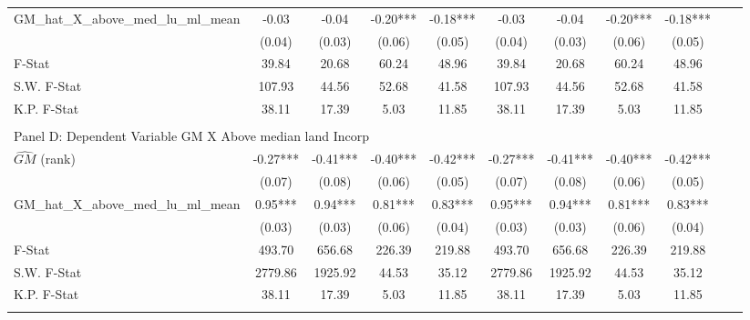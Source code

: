 \begin{table}[htbp]
\begin{threeparttable}
\begin{tabular}{l*{10}{c}}
\addlinespace
GM\_hat\_X\_above\_med\_lu\_ml\_mean&      -0.03   &      -0.04   &      -0.20***&      -0.18***&      -0.03   &      -0.04   &      -0.20***&      -0.18***\\
                &     (0.04)   &     (0.03)   &     (0.06)   &     (0.05)   &     (0.04)   &     (0.03)   &     (0.06)   &     (0.05)   \\
\midrule
F-Stat          &      39.84   &      20.68   &      60.24   &      48.96   &      39.84   &      20.68   &      60.24   &      48.96   \\
S.W. F-Stat     &     107.93   &      44.56   &      52.68   &      41.58   &     107.93   &      44.56   &      52.68   &      41.58   \\
K.P. F-Stat     &      38.11   &      17.39   &       5.03   &      11.85   &      38.11   &      17.39   &       5.03   &      11.85   \\
\cmidrule[\heavyrulewidth](lr){1-9} \\ \cmidrule[\heavyrulewidth](lr){1-9}
\multicolumn{8}{l}{Panel D: Dependent Variable GM X Above median land Incorp}\\
\cmidrule(lr){1-9}
$\hat{GM}$ (rank)&      -0.27***&      -0.41***&      -0.40***&      -0.42***&      -0.27***&      -0.41***&      -0.40***&      -0.42***\\
                &     (0.07)   &     (0.08)   &     (0.06)   &     (0.05)   &     (0.07)   &     (0.08)   &     (0.06)   &     (0.05)   \\
\addlinespace
GM\_hat\_X\_above\_med\_lu\_ml\_mean&       0.95***&       0.94***&       0.81***&       0.83***&       0.95***&       0.94***&       0.81***&       0.83***\\
                &     (0.03)   &     (0.03)   &     (0.06)   &     (0.04)   &     (0.03)   &     (0.03)   &     (0.06)   &     (0.04)   \\
\midrule
F-Stat          &     493.70   &     656.68   &     226.39   &     219.88   &     493.70   &     656.68   &     226.39   &     219.88   \\
S.W. F-Stat     &    2779.86   &    1925.92   &      44.53   &      35.12   &    2779.86   &    1925.92   &      44.53   &      35.12   \\
K.P. F-Stat     &      38.11   &      17.39   &       5.03   &      11.85   &      38.11   &      17.39   &       5.03   &      11.85   \\
\cmidrule[\heavyrulewidth](lr){1-9} \\ \cmidrule[\heavyrulewidth](lr){1-9}

\end{tabular}
\end{threeparttable}
\end{table}
